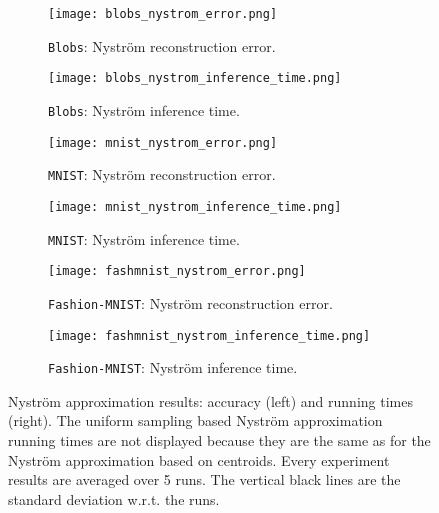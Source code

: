 \begin{figure}
\begin{subfigure}[b]{.49\textwidth}
\texttt{[image: blobs\_nystrom\_error.png]}
\caption{\texttt{Blobs}: Nyström reconstruction error.}
\label{fig:blobs:nystrom_error}
\end{subfigure}
\begin{subfigure}[b]{.49\textwidth}
\texttt{[image: blobs\_nystrom\_inference\_time.png]}
\caption{\texttt{Blobs}: Nyström inference time.}
\label{fig:blobs:nystrom_time}
\end{subfigure}
\begin{subfigure}[b]{.49\textwidth}
\texttt{[image: mnist\_nystrom\_error.png]}
\caption{\texttt{MNIST}: Nyström reconstruction error.}
\label{fig:mnist:nystrom_error}
\end{subfigure}
\begin{subfigure}[b]{.49\textwidth}
\texttt{[image: mnist\_nystrom\_inference\_time.png]}
\caption{\texttt{MNIST}: Nyström inference time.}
\label{fig:mnist:nystrom_time}
\end{subfigure}
\begin{subfigure}[b]{.49\textwidth}
\texttt{[image: fashmnist\_nystrom\_error.png]}
\caption{\texttt{Fashion-MNIST}: Nyström reconstruction error.}
\label{fig:fashmnist:nystrom_error}
\end{subfigure}
\begin{subfigure}[b]{.49\textwidth}
\texttt{[image: fashmnist\_nystrom\_inference\_time.png]}
\caption{\texttt{Fashion-MNIST}: Nyström inference time.}
\label{fig:fashmnist:nystrom_time}
\end{subfigure}
\caption{Nystr\"om approximation results: accuracy (left) and running times (right). The uniform sampling based Nyström approximation running times are not displayed because they are the same as for the Nyström approximation based on \kmeans centroids. Every experiment results are averaged over 5 runs. The vertical black lines are the standard deviation w.r.t. the runs.}
\label{fig:nystrom}
\end{figure}




